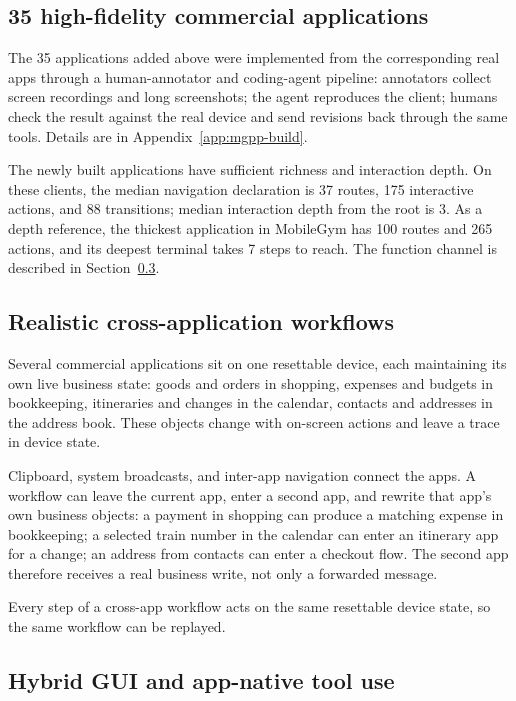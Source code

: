 \subsection{35 high-fidelity commercial applications}
\label{sec:mgpp-apps}

The 35 applications added above were implemented from the corresponding real apps through a human-annotator and coding-agent pipeline: annotators collect screen recordings and long screenshots; the agent reproduces the client; humans check the result against the real device and send revisions back through the same tools. Details are in Appendix~\ref{app:mgpp-build}.

The newly built applications have sufficient richness and interaction depth. On these clients, the median navigation declaration is 37 routes, 175 interactive actions, and 88 transitions; median interaction depth from the root is 3. As a depth reference, the thickest application in MobileGym has 100 routes and 265 actions, and its deepest terminal takes 7 steps to reach. The function channel is described in Section~\ref{sec:mgpp-tools}.





\subsection{Realistic cross-application workflows}
\label{sec:mgpp-crossapp}

Several commercial applications sit on one resettable device, each maintaining its own live business state: goods and orders in shopping, expenses and budgets in bookkeeping, itineraries and changes in the calendar, contacts and addresses in the address book. These objects change with on-screen actions and leave a trace in device state.

Clipboard, system broadcasts, and inter-app navigation connect the apps. A workflow can leave the current app, enter a second app, and rewrite that app's own business objects: a payment in shopping can produce a matching expense in bookkeeping; a selected train number in the calendar can enter an itinerary app for a change; an address from contacts can enter a checkout flow. The second app therefore receives a real business write, not only a forwarded message.

Every step of a cross-app workflow acts on the same resettable device state, so the same workflow can be replayed.

\subsection{Hybrid GUI and app-native tool use}
\label{sec:mgpp-tools}

